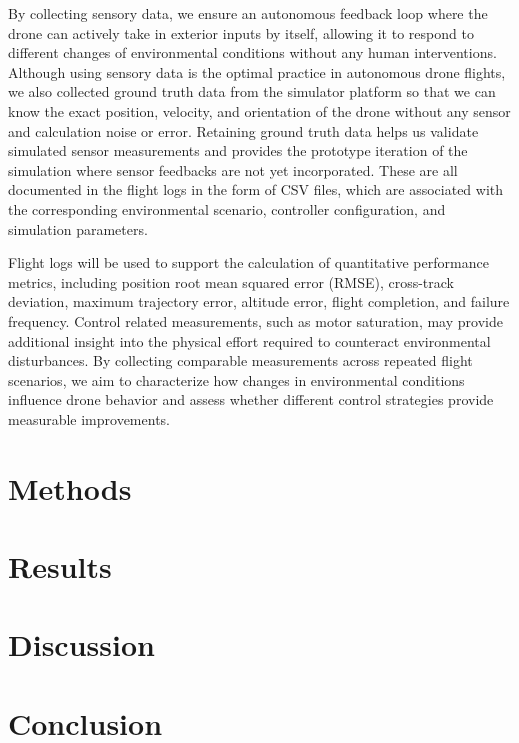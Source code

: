 \documentclass[12pt,letterpaper]{article}
\begin{document}
By collecting sensory data, we ensure an autonomous feedback loop where the drone can actively take in exterior inputs by itself, allowing it to respond to different changes of environmental conditions without any human interventions. Although using sensory data is the optimal practice in autonomous drone flights, we also collected ground truth data from the simulator platform so that we can know the exact position, velocity, and orientation of the drone without any sensor and calculation noise or error. Retaining ground truth data helps us validate simulated sensor measurements and provides the prototype iteration of the simulation where sensor feedbacks are not yet incorporated. These are all documented in the flight logs in the form of CSV files, which are associated with the corresponding environmental scenario, controller configuration, and simulation parameters.  

Flight logs will be used to support the calculation of quantitative performance metrics, including position root mean squared error (RMSE), cross-track deviation, maximum trajectory error, altitude error, flight completion, and failure frequency. Control related measurements, such as motor saturation, may provide additional insight into the physical effort required to counteract environmental disturbances. By collecting comparable measurements across repeated flight scenarios, we aim to characterize how changes in environmental conditions influence drone behavior and assess whether different control strategies provide measurable improvements.



\iffalse
\section{Methods}

\section{Results}

\section{Discussion}

\section{Conclusion}
\end{document}

